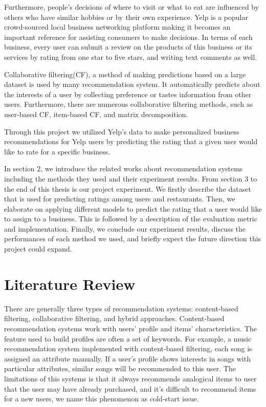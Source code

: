 \documentclass{llncs}
\begin{document}
Furthermore, people's decisions of where to visit or what to eat are influenced by others who have similar hobbies or by their own experience. Yelp is a popular crowd-sourced local business networking platform making it becomes an important reference for assisting consumers to make decisions. In terms of each business, every user can submit a review on the products of this business or its services by rating from one star to five stars, and writing text comments as well.

Collaborative filtering(CF), a method of making predictions based on a large dataset is used by many recommendation system. It automatically predicts about the interests of a user by collecting preference or tastes information from other users. Furthermore, there are numerous collaborative filtering methods, such as user-based CF, item-based CF, and matrix decomposition. 

Through this project we utilized Yelp's data to make personalized business recommendations for Yelp users by predicting the rating that a given user would like to rate for a specific business.

In section 2, we introduce the related works about recommendation systems including the methods they used and their experiment results. From section 3 to the end of this thesis is our project experiment. We firstly describe the dataset that is used for predicting ratings among users and restaurants. Then, we elaborate on applying different models to predict the rating that a user would like to assign to a business. This is followed by a description of the evaluation metric and implementation. Finally, we conclude our experiment results, discuss the performances of each method we used, and briefly expect the future direction this project could expand.

\section{Literature Review}
There are generally three types of recommendation systems: content-based filtering, collaborative filtering, and hybrid approaches. Content-based recommendation systems work with users' profile and items' characteristics. The feature used to build profiles are often a set of keywords. For example, a music recommendation system\cite{MJ} implemented with content-based filtering, each song is assigned an attribute manually. If a user’s profile shows interests in songs with particular attributes, similar songs will be recommended to this user. The limitations of this systems is that it always recommends analogical items to user that the user may have already purchased, and it’s difficult to recommend items for a new users, we name this phenomenon as cold-start issue. 
\end{document}

